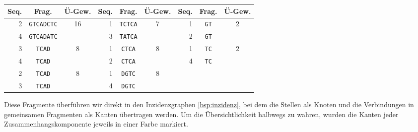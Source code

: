 \begin{tabular}{|r|c|c||r|c|c||r|c|c|}
	\hline
	Seq. & Frag. & Ü-Gew. & Seq. & Frag. & Ü-Gew. & Seq. & Frag. & Ü-Gew.\\
	\hline
	2 & \texttt{GTCADCTC} & \multirow{2}{*}{16} & 1 & \texttt{TCTCA} & \multirow{2}{*}{7} & 1 & \texttt{GT} &\multirow{2}{*}{2} \\
	4 & \texttt{GTCADATC} &                     & 3 & \texttt{TATCA} &                     & 2 & \texttt{GT} & \\
	3 & \texttt{TCAD} & \multirow{2}{*}{8} & 1 & \texttt{CTCA} & \multirow{2}{*}{8} & 1 & \texttt{TC} & \multirow{2}{*}{2} \\
	4 & \texttt{TCAD} &                     & 2 & \texttt{CTCA} &                          & 4 & \texttt{TC} & \\
	2 & \texttt{TCAD} & \multirow{2}{*}{8} & 1 & \texttt{DGTC} & \multirow{2}{*}{8} &    &   & \\
	3 & \texttt{TCAD} &                     & 4 & \texttt{DGTC} &                     &    &   & \\
	\hline
\end{tabular}

Diese Fragmente überführen wir direkt in den Inzidenzgraphen \ref{bsp:inzidenz}, bei dem die Stellen als Knoten und die Verbindungen in gemeinsamen Fragmenten als Kanten übertragen werden. Um die Übersichtlichkeit halbwegs zu wahren, wurden die Kanten jeder Zusammenhangskomponente jeweils in einer Farbe markiert.


